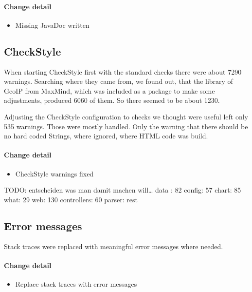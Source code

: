 \paragraph{Change detail}
\begin{itemize}
  \item Missing JavaDoc written
\end{itemize}

\subsection{CheckStyle}\label{cs} %
When starting CheckStyle first with the standard checks there were about 7290 warnings.
Searching where they came from, we found out, that the library of GeoIP from MaxMind, 
which was included as a package to make some adjustments, produced 6060 of them. So there seemed to be about
1230.

Adjusting the CheckStyle configuration to checks we thought were useful left only 535 warnings.
Those were mostly handled. Only the warning that there should be no hard coded Strings, where
ignored, where HTML code was build.

\paragraph{Change detail}
\begin{itemize}
  \item CheckStyle warnings fixed
\end{itemize}
TODO: entscheiden was man damit machen will\ldots
data : 82
config: 57
chart: 85
what: 29
web: 130
controllers: 60 
parser: rest

\subsection{Error messages}
Stack traces were replaced with meaningful error messages where needed.
\paragraph{Change detail}
\begin{itemize}
  \item Replace stack traces with error messages
\end{itemize}

 
